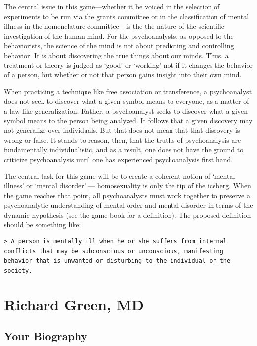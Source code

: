 \begin{refsection}
The central issue in this game---whether it be voiced in the selection of experiments to be run via the grants committee or in the classification of mental illness in the nomenclature committee---is the the nature of the scientific investigation of the human mind. For the psychoanalysts, as opposed to the behaviorists, the science of the mind is not about predicting and controlling behavior. It is about discovering the true things about our minds. Thus, a treatment or theory is judged as `good' or `working' not if it changes the behavior of a person, but whether or not that person gains insight into their own mind.

When practicing a technique like free association or transference, a psychoanalyst does not seek to discover what a given symbol means to everyone, as a matter of a law-like generalization. Rather, a psychoanalyst seeks to discover what a given symbol means to the person being analyzed. It follows that a given discovery may not generalize over individuals. But that does not mean that that discovery is wrong or false. It stands to reason, then, that the truths of psychoanalysis are fundamentally individualistic, and as a result, one does not have the ground to criticize psychoanalysis until one has experienced psychoanalysis first hand.

The central task for this game will be to create a coherent notion of `mental illness' or `mental disorder' --- homosexuality is only the tip of the iceberg. When the game reaches that point, all psychoanalysts must work together to preserve a psychoanalytic understanding of mental order and mental disorder in terms of the dynamic hypothesis (see the game book for a definition). The proposed definition should be something like:

\begin{verbatim}
> A person is mentally ill when he or she suffers from internal conflicts that may be subconscious or unconscious, manifesting behavior that is unwanted or disturbing to the individual or the society.
\end{verbatim}

\chapter{Richard Green, MD}
\label{richardgreenmd}

\section{Your Biography}
\label{yourbiography}


\end{refsection}
